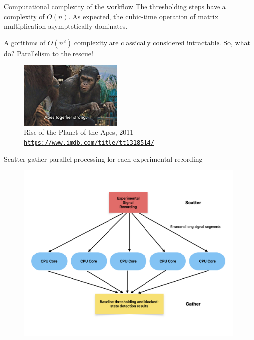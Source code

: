 \documentclass{beamer}
\begin{document}
\begin{frame}{Computational complexity of the workflow}
    The thresholding steps have a complexity of $O(n)$. As expected, the cubic-time operation of matrix multiplication asymptotically dominates.\pause
    \begin{block}{Algorithms of $O(n^3)$ complexity are classically considered intractable. So, what do?}
        Parallelism to the rescue!\\\vspace{3mm}
        \begin{figure}
            \includegraphics[width=5cm]{assets/apes.png}
            \caption{Rise of the Planet of the Apes, 2011 \href{https://www.imdb.com/title/tt1318514/}{\texttt{https://www.imdb.com/title/tt1318514/}}}
        \end{figure}
        
    \end{block}
\end{frame}


\begin{frame}{Scatter-gather parallel processing for each experimental recording}
    \begin{figure}
        \includegraphics[width=\linewidth]{assets/scatter-gather-recording.png}
    \end{figure}
\end{frame}
\end{document}
